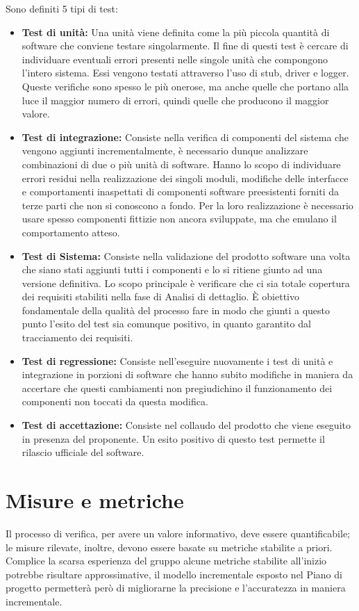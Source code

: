 \documentclass[a4paper]{report}
\begin{document}
				Sono definiti 5 tipi di test:
				\begin{itemize}
					\item \textbf{Test di unità:} Una unità viene definita come la più piccola quantità di software che conviene
					testare singolarmente. Il fine di questi test è cercare di individuare eventuali errori presenti nelle singole
					unità che compongono l'intero sistema. Essi vengono testati attraverso l'uso di stub, driver e logger. Queste
					verifiche sono spesso le più onerose, ma anche quelle che portano alla luce il maggior numero di errori, quindi
					quelle che producono il maggior valore.
					\item \textbf{Test di integrazione:} Consiste nella verifica di componenti del sistema che vengono aggiunti
					incrementalmente, è necessario dunque analizzare combinazioni di due o più unità di software. Hanno lo scopo di
					individuare errori residui nella realizzazione dei singoli moduli, modifiche delle interfacce e comportamenti
					inaspettati di componenti software preesistenti forniti da terze parti che non si conoscono a fondo. Per la
					loro realizzazione è necessario usare spesso componenti fittizie non ancora sviluppate, ma che emulano il
					comportamento atteso.
					\item \textbf{Test di Sistema:} Consiste nella validazione del prodotto software una volta che siano stati
					aggiunti tutti i componenti e lo si ritiene giunto ad una versione definitiva. Lo scopo principale è verificare
					che ci sia totale copertura dei requisiti stabiliti nella fase di Analisi di dettaglio. È obiettivo
					fondamentale della qualità del processo fare in modo che giunti a questo punto l'esito del test sia comunque
					positivo, in quanto garantito dal tracciamento dei requisiti.
					\item \textbf{Test di regressione:} Consiste nell'eseguire nuovamente i test di unità e integrazione in
					porzioni di software che hanno subito modifiche in maniera da accertare che questi cambiamenti non
					pregiudichino il funzionamento dei componenti non toccati da questa modifica.
					\item \textbf{Test di accettazione:} Consiste nel collaudo del prodotto che viene eseguito in presenza del
					proponente. Un esito positivo di questo test permette il rilascio ufficiale del software.
					
				\end{itemize}
				
		\section{Misure e metriche}
			Il processo di verifica, per avere un valore informativo, deve essere quantificabile; le misure rilevate, inoltre,
			devono essere basate su metriche stabilite a priori. Complice la scarsa esperienza del gruppo alcune metriche stabilite
			all'inizio potrebbe risultare approssimative, il modello incrementale esposto nel Piano di progetto permetterà però di
			migliorarne la precisione e l'accuratezza in maniera incrementale.
			
\end{document}
